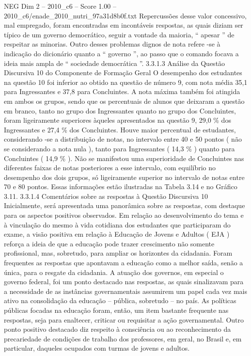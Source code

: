 \begin{textsample}{NEG Dim 2 – 2010\_c6 – Score 1.00 – 2010\_c6/enade\_2010\_nutri\_97a31d8b0f.txt}
Repercussões desse valor concessivo, mal empregado, foram encontradas em incontáveis respostas, as quais diziam ser típico de um governo democrático, seguir a vontade da maioria, “ apesar ” de respeitar as minorias.
Outro desses problemas dignos de nota refere -se à indicação do dicionário quanto a “ governo ”, ao passo que o comando focava a ideia mais ampla de “ sociedade democrática ”. 3.3.1.3 Análise da Questão Discursiva 10 do Componente de Formação Geral O desempenho dos estudantes na questão 10 foi inferior ao obtido na questão de número 9, com nota média 35,1 para Ingressantes e 37,8 para Concluintes.
A nota máxima também foi atingida em ambos os grupos, sendo que os percentuais de alunos que deixaram a questão em branco, tanto no grupo dos Ingressantes quanto no grupo dos Concluintes, foram ligeiramente superiores àqueles apresentados na questão 9, 29,0 \% dos Ingressantes e 27,4 \% dos Concluintes.
Houve maior percentual de estudantes, considerando -se a distribuição de notas, no intervalo entre 40 e 50 pontos ( não se considerando a nota nula ), tanto para Ingressantes ( 14,3 \% ) quanto para Concluintes ( 14,9 \% ).
Não se manifestou uma superioridade de Concluintes nas diferentes faixas de notas posteriores a esse intervalo, com equilíbrio no desempenho dos dois grupos, só ligeiramente superior no intervalo de notas entre 70 e 80 pontos.
Essas informações estão ilustradas na Tabela 3.14 e no Gráfico 3.11. 3.3.1.4 Comentários sobre as respostas à Questão Discursiva 10 Inicialmente, será apresentada uma panorâmica sobre as respostas, com destaque para os aspectos positivos observados.
Em relação ao desenvolvimento do tema e à vinculação do mesmo à vida cotidiana dos estudantes que participaram do exame, a visão positiva em relação à Educação de Jovens e Adultos ( EJA ) reforça a ideia de que a educação pode trazer crescimento não somente profissional, mas, sobretudo, para ampliar os horizontes da cidadania.
Foram frequentes as respostas que apontavam a educação como a melhor saída, senão a única, para o resgate da cidadania.
A atuação dos governos, em especial o governo federal, foi um ponto destacado nas respostas, as quais sinalizavam para a necessidade de as instâncias governamentais assumirem um papel cada vez mais ativo na consolidação da educação – pública, sobretudo – no país.
As políticas públicas focadas na educação foram, então, um item bastante frequente nas respostas, seja para enaltecer, criticar ou requisitar a ação governamental.
Outro ponto positivo destacado diz respeito à consciência ou ao reconhecimento da precariedade de condições de trabalho dos professores, em geral, no Brasil e, em particular, daqueles ocupados com turmas de jovens e adultos.

\end{textsample}
